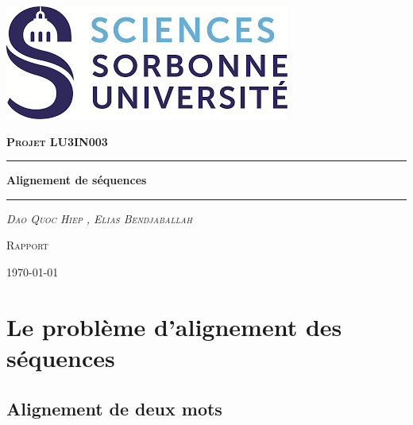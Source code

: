 \documentclass[12pt, a4paper]{report}
\author{Elias Bendjaballah,Dao Quoc Hiep}
\date{today's date}
\begin{document}
\begin{titlepage}

\centering
\includegraphics[scale=0.75]{logo2.png}
\par\vspace{1cm}
\vspace{1cm}
{\scshape\large\textbf{Projet LU3IN003} \par}
\vspace{1.5cm}
\rule{\linewidth}{0.2 mm}
{\huge\bfseries Alignement de séquences \par}
\rule{\linewidth}{0.2 mm}
\par\vspace{2cm}
{\scshape\large\itshape  Dao Quoc Hiep , Elias Bendjaballah \par}
\vfill
\large\textsc{Rapport}
\vfill
{\large \today\par}

\end{titlepage}

\tableofcontents
\pagebreak

\renewcommand{\thesection}{\arabic{section}}
\section{Le problème d'alignement des séquences}
\subsection{Alignement de deux mots}
\end{document}
